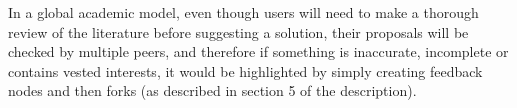 \documentclass[a4paper,11pt]{article}
\begin{document}
\begin{multicols}{2}
In a global academic model, even though users will need to make a thorough review of the literature before suggesting a solution, their proposals will be checked by multiple peers, and therefore if something is inaccurate, incomplete or contains vested interests, it would be highlighted by simply creating feedback nodes and then forks (as described in section 5 of the description).

\end{multicols}
\end{document}
